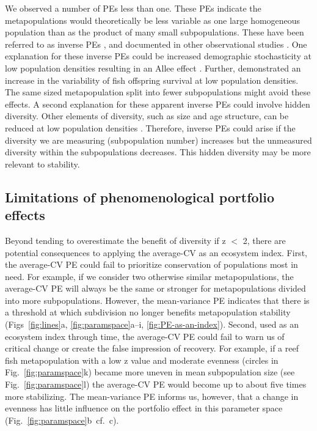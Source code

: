 We observed a number of PEs less than one. These PEs indicate the
metapopulations would theoretically be less variable as one large homogeneous
population than as the product of many small subpopulations. These have been
referred to as inverse PEs \citep{thibaut2013}, and documented in other
observational studies \citep{deClerck2006}.
One explanation for these inverse PEs could be increased
demographic stochasticity at low population densities resulting in an Allee
effect \citep{allee1931}. Further, \citet{minto2008} demonstrated an
increase in the variability of fish offspring survival at low population
densities. The same sized metapopulation split into fewer subpopulations might
avoid these effects. A second explanation for these apparent inverse PEs
could involve hidden diversity. Other elements of diversity, such as size and
age structure, can be reduced at low population densities
\citep[e.g.][]{hutchings1993}. Therefore, inverse PEs could arise if the
diversity we are measuring (subpopulation number) increases but the unmeasured
diversity within the subpopulations decreases. This hidden diversity may be
more relevant to stability.

\subsection{Limitations of phenomenological portfolio effects}

Beyond tending to overestimate the benefit of diversity if z $<$ 2, there are
potential consequences to applying the average-CV as an ecosystem index. First,
the average-CV PE could fail to prioritize conservation of populations most in
need. For example, if we consider two otherwise similar metapopulations, the
average-CV PE will always be the same or stronger for metapopulations divided
into more subpopulations. However, the mean-variance PE indicates that there is
a threshold at which subdivision no longer benefits metapopulation stability
(Figs~\ref{fig:lines}a, \ref{fig:paramspace}a--i, \ref{fig:PE-as-an-index}).
Second, used as an ecosystem index through time, the average-CV PE could fail to
warn us of critical change or create the false impression of recovery. For
example, if a reef fish metapopulation with a low z value and moderate evenness
(circles in Fig.~\ref{fig:paramspace}k) became more uneven in mean subpopulation
size (see Fig.~\ref{fig:paramspace}l) the average-CV PE would become up to about
five times more stabilizing. The mean-variance PE informs us, however, that a
change in evenness has little influence on the portfolio effect in this
parameter space (Fig.~\ref{fig:paramspace}b~cf.~c).

